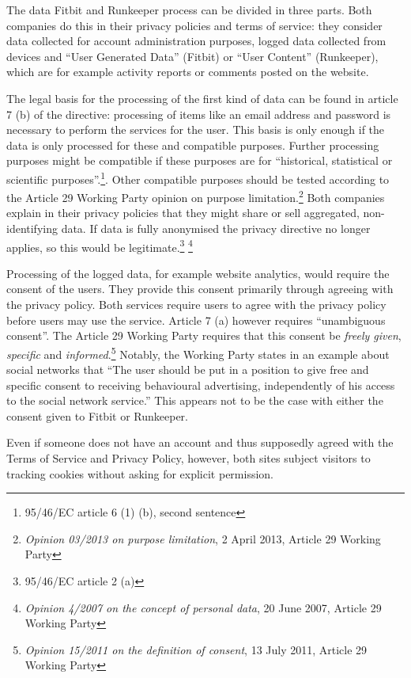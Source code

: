 \documentclass{article}
\begin{document}
The data Fitbit and Runkeeper process can be divided in three parts. Both companies do this in their privacy policies and terms of service: they consider data collected for account administration purposes, logged data collected from devices and ``User Generated Data'' (Fitbit) or ``User Content'' (Runkeeper), which are for example activity reports or comments posted on the website.

The legal basis for the processing of the first kind of data can be found in article 7 (b) of the directive: processing of items like an email address and password is necessary to perform the services for the user.
This basis is only enough if the data is only processed for these and compatible purposes.
Further processing purposes might be compatible if these purposes are for ``historical, statistical or scientific purposes''.\footnote{95/46/EC article 6 (1) (b), second sentence}.
Other compatible purposes should be tested according to the Article 29 Working Party opinion on purpose limitation.\footnote{\emph{Opinion 03/2013 on purpose limitation}, 2 April 2013, Article 29 Working Party}
Both companies explain in their privacy policies that they might share or sell aggregated, non-identifying data.
If data is fully anonymised the privacy directive no longer applies, so this would be legitimate.\footnote{95/46/EC article 2 (a)} \footnote{\emph{Opinion 4/2007 on the concept of personal data}, 20 June 2007, Article 29 Working Party}

Processing of the logged data, for example website analytics, would require the consent of the users.
They provide this consent primarily through agreeing with the privacy policy.
Both services require users to agree with the privacy policy before users may use the service.
Article 7 (a) however requires ``unambiguous consent''.
The Article 29 Working Party requires that this consent be \emph{freely given}, \emph{specific} and \emph{informed}.\footnote{\emph{Opinion 15/2011 on the definition of consent}, 13 July 2011, Article 29 Working Party}
Notably, the Working Party states in an example about social networks that ``The user should be put in a position to give free and specific consent to receiving behavioural advertising, independently of his access to the social network service.''
This appears not to be the case with either the consent given to Fitbit or Runkeeper.

Even if someone does not have an account and thus supposedly agreed with the Terms of Service and Privacy Policy, however, both sites subject visitors to tracking cookies without asking for explicit permission.
\end{document}
